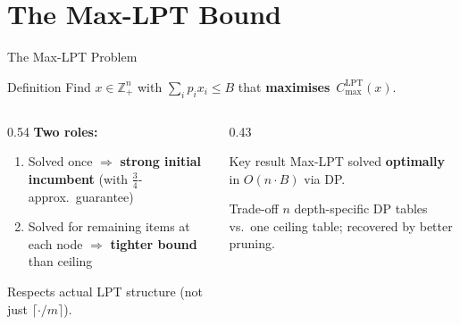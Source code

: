 \documentclass[fleqn,11pt,aspectratio=43]{beamer}
\newcommand{\Clpt}{C_{\max}^{\mathrm{LPT}}}
\begin{document}
\section{The Max-LPT Bound}

\begin{frame}[shrink=8]{The Max-LPT Problem}
  \begin{block}{Definition}
    Find $x\in\mathbb{Z}_+^n$ with $\sum_i p_ix_i\leq B$ that \textbf{maximises}~$\Clpt(x)$.
  \end{block}
  \begin{columns}[T]
    \begin{column}{0.54\textwidth}
      \textbf{Two roles:}
      \begin{enumerate}
        \item Solved once $\Rightarrow$ \textbf{strong initial incumbent} (with $\tfrac34$-approx.\ guarantee)
        \item Solved for remaining items at each node $\Rightarrow$ \textbf{tighter bound} than ceiling
      \end{enumerate}
      Respects actual LPT structure (not just $\lceil\cdot/m\rceil$).
    \end{column}
    \begin{column}{0.43\textwidth}
      \begin{alertblock}{Key result}
        Max-LPT solved \textbf{optimally} in $O(n\cdot B)$ via DP.
      \end{alertblock}
      \begin{block}{Trade-off}
        \small $n$ depth-specific DP tables vs.\ one ceiling table; recovered by better pruning.
      \end{block}
    \end{column}
  \end{columns}
\end{frame}
\end{document}
